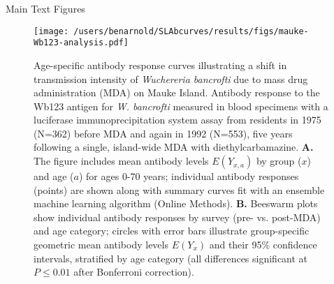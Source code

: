 \documentclass[11pt]{article}
\title{}
\author{}
\date{}
\begin{document}
\begin{center}
{\Large Main Text Figures}
\end{center}

\begin{figure}[htbp]
\begin{center}
\texttt{[image: /users/benarnold/SLAbcurves/results/figs/mauke-Wb123-analysis.pdf]}
\begin{minipage}{\textwidth}
\caption{Age-specific antibody response curves illustrating a shift in transmission intensity of \textit{Wuchereria bancrofti} due to mass drug administration (MDA) on Mauke Island.  Antibody response to the Wb123 antigen for \textit{W. bancrofti} measured in blood specimens with a luciferase immunoprecipitation system assay from residents in 1975 (N=362) before MDA and again in 1992 (N=553), five years following a single, island-wide MDA with diethylcarbamazine. \textbf{A.} The figure includes mean antibody levels $E(Y_{x,a})$ by group ($x$) and age ($a$) for ages 0-70 years; individual antibody responses (points) are shown along with summary curves fit with an ensemble machine learning algorithm (Online Methods). \textbf{B.} Beeswarm plots show individual antibody responses by survey (pre- vs. post-MDA) and age category; circles with error bars illustrate group-specific geometric mean antibody levels $E(Y_{x})$ and their 95\% confidence intervals, stratified by age category (all differences significant at $P\leq0.01$ after Bonferroni correction).  }
\label{fig:mauke}
\end{minipage}
\end{center}
\end{figure}


\end{document}
